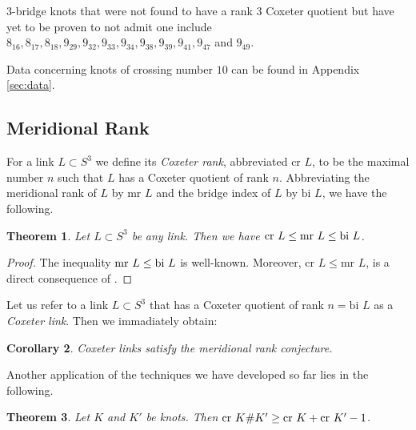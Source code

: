 \documentclass{article}
\newtheorem{theorem}{Theorem}[section]
\newtheorem{corollary}[theorem]{Corollary}
\theoremstyle{definition}
\begin{document}
$3$-bridge knots that were not found to have a rank $3$ Coxeter quotient but have yet to be proven to not admit one include $8_{16}, 8_{17}, 8_{18}, 9_{29}, 9_{32}, 9_{33}, 9_{34}, 9_{38}, 9_{39}, 9_{41}, 9_{47}$ and $9_{49}$.

Data concerning knots of crossing number $10$ can be found in Appendix \ref{sec:data}.

\subsection{Meridional Rank}\label{subsec:meridional-rank}
For a link $L \subset S^3$ we define its \textit{Coxeter rank}, abbreviated $\text{cr } L$, to be the maximal number $n$ such that $L$ has a Coxeter quotient of rank $n$. Abbreviating the meridional rank of $L$ by $\text{mr }L$ and the bridge index of $L$ by $\text{bi } L$, we have the following.

\begin{theorem}
Let $L \subset S^3$ be any link. Then we have $\textup{cr }L \leq \textup{mr }L \leq \textup{bi } L$.
\end{theorem}

\begin{proof}
The inequality $\textup{mr } L \leq \text{bi } L$ is well-known. Moreover, $\text{cr } L \leq \text{mr } L$, is a direct consequence of \cite[Lemma 2.1]{felikson2009}.
\end{proof}

Let us refer to a link $L \subset S^3$ that has a Coxeter quotient of rank $n = \text{bi } L$ as a \textit{Coxeter link}. Then we immadiately obtain:

\begin{corollary}\label{cor:coxeter-links-meridional-rank}
Coxeter links satisfy the meridional rank conjecture.
\end{corollary}

Another application of the techniques we have developed so far lies in the following.

\begin{theorem}\label{thm:connected-sums-coxeter-rank}
Let $K$ and $K'$ be knots. Then $\textup{cr } K\#K' \geq \textup{cr } K + \textup{cr } K' - 1$.
\end{theorem}
\end{document}

